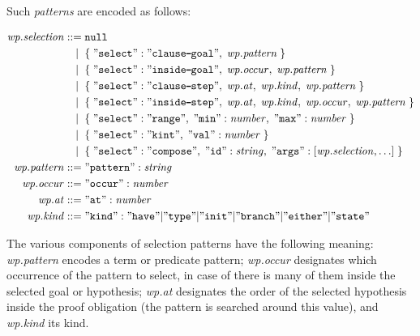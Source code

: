 Such \emph{patterns} are encoded as follows:

\newcommand{\dash}{\rule[0.5ex]{1ex}{1pt}}

\begin{align*}
    \mathit{wp.selection}
    ::=\;& \mathtt{null} \\
    |\;\;& \mathtt{\{}\; \mathtt{"select":"clause\dash{}goal"},\;
                         \mathit{wp.pattern} \;\mathtt{\}} \\
    |\;\;& \mathtt{\{}\; \mathtt{"select":"inside\dash{}goal"},\;
                         \mathit{wp.occur},\; \mathit{wp.pattern} \;\mathtt{\}} \\
    |\;\;& \mathtt{\{}\; \mathtt{"select":"clause\dash{}step"},\;
                         \mathit{wp.at},\; \mathit{wp.kind},\;
                         \mathit{wp.pattern} \;\mathtt{\}} \\
    |\;\;& \mathtt{\{}\; \mathtt{"select":"inside\dash{}step"},\;
                         \mathit{wp.at},\; \mathit{wp.kind},\;
                         \mathit{wp.occur},\; \mathit{wp.pattern} \;\mathtt{\}} \\
    |\;\;& \mathtt{\{}\; \mathtt{"select":"range"},\;
                         \mathtt{"min"}:\mathit{number},\;
                         \mathtt{"max"}:\mathit{number} \;\mathtt{\}} \\
    |\;\;& \mathtt{\{}\; \mathtt{"select":"kint"},\;
                         \mathtt{"val"}:\mathit{number} \;\mathtt{\}} \\
    |\;\;& \mathtt{\{}\; \mathtt{"select":"compose"},\;
                         \mathtt{"id"}:\mathit{string},\;
                         \mathtt{"args"}:[\mathit{wp.selection},\ldots]
                         \;\mathtt{\}} \\
    \mathit{wp.pattern} ::=\;& \mathtt{"pattern"} : \mathit{string} \\
    \mathit{wp.occur}   ::=\;& \mathtt{"occur"} : \mathit{number} \\
    \mathit{wp.at}      ::=\;& \mathtt{"at"} : \mathit{number} \\
    \mathit{wp.kind}    ::=\;& \mathtt{"kind"} : \mathtt{"have"|"type"|"init"|"branch"|"either"|"state"} \\
\end{align*}

The various components of selection patterns have the following meaning: \textit{wp.pattern} encodes
a term or predicate pattern; \textit{wp.occur} designates which occurrence of the pattern to select,
in case of there is many of them inside the selected goal or hypothesis; \textit{wp.at} designates the
order of the selected hypothesis inside the proof obligation (the pattern is searched around this value),
and \textit{wp.kind} its kind.

